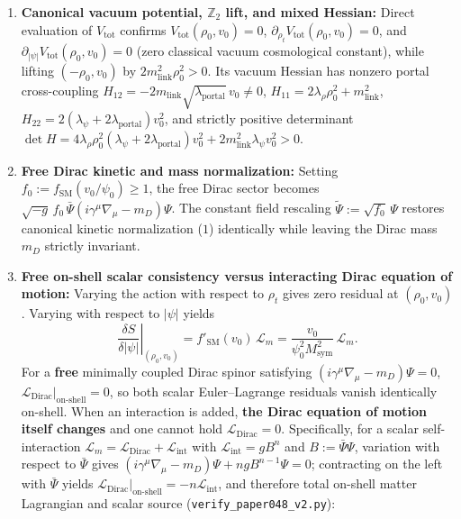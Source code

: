 \documentclass[
  american,
  11pt,
  letterpaper,
]{article}
\providecommand{\tightlist}{%
  \setlength{\itemsep}{0pt}\setlength{\parskip}{0pt}}
\begin{document}
\begin{enumerate}
\def\labelenumi{\arabic{enumi}.}
\tightlist
\item
  \textbf{Canonical vacuum potential, \(\mathbb{Z}_2\) lift, and mixed Hessian:} Direct evaluation of \(V_{\mathrm{tot}}\) confirms \(V_{\mathrm{tot}}(\rho_0, v_0) = 0\), \(\partial_{\rho_t} V_{\mathrm{tot}}(\rho_0, v_0) = 0\), and \(\partial_{|\psi|} V_{\mathrm{tot}}(\rho_0, v_0) = 0\) (zero classical vacuum cosmological constant), while lifting \((-\rho_0, v_0)\) by \(2 m_{\mathrm{link}}^2 \rho_0^2 > 0\). Its vacuum Hessian has nonzero portal cross-coupling \(H_{12} = -2 m_{\mathrm{link}}\sqrt{\lambda_{\mathrm{portal}}}\,v_0 \neq 0\), \(H_{11} = 2\lambda_\rho\rho_0^2 + m_{\mathrm{link}}^2\), \(H_{22} = 2(\lambda_\psi + 2\lambda_{\mathrm{portal}})v_0^2\), and strictly positive determinant \(\det H = 4\lambda_\rho\rho_0^2(\lambda_\psi + 2\lambda_{\mathrm{portal}})v_0^2 + 2 m_{\mathrm{link}}^2\lambda_\psi v_0^2 > 0\).
\item
  \textbf{Free Dirac kinetic and mass normalization:} Setting \(f_0 := f_{\mathrm{SM}}(v_0/\psi_0) \ge 1\), the free Dirac sector becomes \(\sqrt{-g}\,f_0\,\bar{\Psi}(i\gamma^\mu\nabla_\mu - m_D)\Psi\). The constant field rescaling \(\tilde{\Psi} := \sqrt{f_0}\,\Psi\) restores canonical kinetic normalization (\(1\)) identically while leaving the Dirac mass \(m_D\) strictly invariant.
\item
  \textbf{Free on-shell scalar consistency versus interacting Dirac equation of motion:} Varying the action with respect to \(\rho_t\) gives zero residual at \((\rho_0, v_0)\). Varying with respect to \(|\psi|\) yields \begin{equation}
\left.\frac{\delta S}{\delta |\psi|}\right|_{(\rho_0, v_0)} = f'_{\mathrm{SM}}(v_0)\,\mathcal{L}_m = \frac{v_0}{\psi_0^2 M_{\mathrm{sym}}^2}\,\mathcal{L}_m.
\end{equation} For a \textbf{free} minimally coupled Dirac spinor satisfying \((i\gamma^\mu\nabla_\mu - m_D)\Psi = 0\), \(\mathcal{L}_{\mathrm{Dirac}}\big|_{\mathrm{on\text{-}shell}} = 0\), so both scalar Euler--Lagrange residuals vanish identically on-shell. When an interaction is added, \textbf{the Dirac equation of motion itself changes} and one cannot hold \(\mathcal{L}_{\mathrm{Dirac}} = 0\). Specifically, for a scalar self-interaction \(\mathcal{L}_m = \mathcal{L}_{\mathrm{Dirac}} + \mathcal{L}_{\mathrm{int}}\) with \(\mathcal{L}_{\mathrm{int}} = g B^n\) and \(B := \bar{\Psi}\Psi\), variation with respect to \(\bar{\Psi}\) gives \((i\gamma^\mu\nabla_\mu - m_D)\Psi + n g B^{n-1}\Psi = 0\); contracting on the left with \(\bar{\Psi}\) yields \(\mathcal{L}_{\mathrm{Dirac}}\big|_{\mathrm{on\text{-}shell}} = -n\mathcal{L}_{\mathrm{int}}\), and therefore total on-shell matter Lagrangian and scalar source (\nolinkurl{verify_paper048_v2.py}): \begin{equation}

\end{equation}
\end{enumerate}
\end{document}
